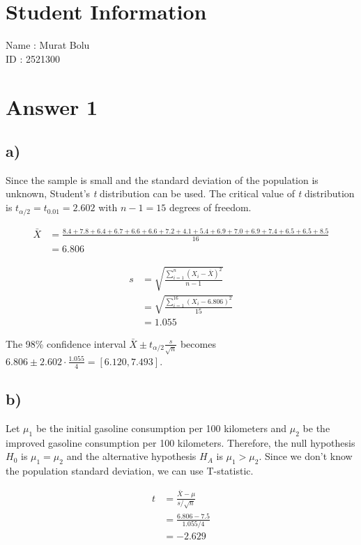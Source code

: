 \documentclass[12pt]{article}
\begin{document}
\section*{Student Information}

Name : Murat Bolu \\

ID : 2521300 \\


\section*{Answer 1}
\subsection*{a)}

Since the sample is small and the standard deviation of the population is
unknown, Student's \textit{t} distribution can be used. The critical value of
\textit{t} distribution is $\textit{t}_{\alpha/2} = \textit{t}_{0.01} = 2.602$
with $n-1=15$ degrees of freedom.

\begin{align*}
    \bar{X}&= \frac{8.4+7.8+6.4+6.7+6.6+6.6+7.2+4.1+
                    5.4+6.9+7.0+6.9+7.4+6.5+6.5+8.5}{16} \\
    &= 6.806
\end{align*}

\begin{align*}
    s &= \sqrt{\frac{\sum_{i=1}^{n}(X_i - \bar{X})^2 }{n-1}} \\
    &= \sqrt{\frac{\sum_{i=1}^{16}(X_i - 6.806)^2}{15}} \\
    &= 1.055
\end{align*}

The 98\% confidence interval $\bar{X} \pm \textit{t}_{\alpha/2}
\frac{s}{\sqrt{n}}$ becomes $6.806 \pm 2.602 \cdot \frac{1.055}{4} =
[6.120,7.493]$.

\subsection*{b)}

Let $\mu_1$ be the initial gasoline consumption per 100 kilometers and $\mu_2$
be the improved gasoline consumption per 100 kilometers. Therefore, the null
hypothesis $H_0$ is $\mu_1 = \mu_2$ and the alternative hypothesis $H_A$ is
$\mu_1 > \mu_2$. Since we don't know the population standard deviation, we can
use T-statistic.

\begin{align*}
    \textit{t} &= \frac{\bar{X} - \mu}{s / \sqrt{n}} \\
    &= \frac{6.806 - 7.5}{1.055 / 4} \\
    &= -2.629
\end{align*}
\end{document}
